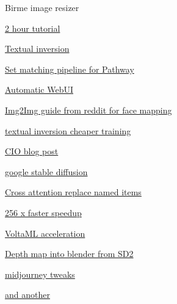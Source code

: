               Birme image resizer
             
              \href{https://www.youtube.com/watch?v=Bdl-jWR3Ukc\&t=34}{2
              hour tutorial}
             
           
            \href{https://www.reddit.com/r/StableDiffusion/comments/10gs4s2/new_expert_tutorial_for_textual_inversion_text/}{Textual
            inversion}
           
            \href{https://docs.google.com/document/d/1cbMnxlxngPfqo3i0_miLZiHt-S5mtSNotjdFAEizooA/edit?usp=sharing}{Set
            matching pipeline for Pathway}
           
            \href{https://github.com/AUTOMATIC1111/stable-diffusion-webui}{Automatic
            WebUI}
           
            \href{https://www.reddit.com/r/StableDiffusion/comments/xgurs3/testing_img2img_batch_processing_i_convert_this/}{Img2Img
            guide from reddit for face mapping}
           
            \href{https://github.com/rinongal/textual_inversion}{textual
            inversion cheaper training}
           
            \href{https://danieljeffries.substack.com/p/the-turning-point-for-truly-open?sd=pf}{CIO
            blog post}
           
            \href{https://www.youtube.com/watch?v=lHcPtbZ0Mnc}{google
            stable diffusion}
           
            \href{https://github.com/bloc97/CrossAttentionControl}{Cross
            attention replace named items}
           
            \href{https://the-decoder.com/stable-diffusion-could-soon-generate-images-much-faster/}{256
            x faster speedup}
           
            \href{https://github.com/VoltaML/voltaML-fast-stable-diffusion}{VoltaML
            acceleration}
           
            \href{https://www.youtube.com/watch?v=AeDngG9kQNI}{Depth map
            into blender from SD2}
           
            \href{https://www.reddit.com/r/StableDiffusion/comments/z622mp/trained_midjourney_embedding_on_stable_diffusion/}{midjourney
            tweaks}

             
            \tightlist
             
              \href{https://civitai.com/models/1253/anthro}{and another}
             
